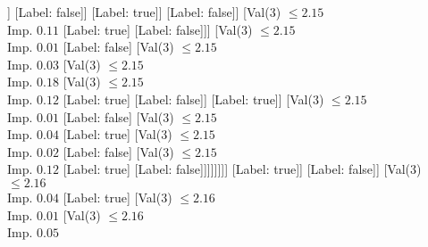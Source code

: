 \documentclass[margin=10pt]{standalone}
\begin{document}
\begin{forest}
																													[Val($3$) $ \leq 2.15$ \\ Imp. $0.02$
																														[Val($3$) $ \leq 2.15$ \\ Imp. $0.13$
																															[Val($3$) $ \leq 2.15$ \\ Imp. $0.03$
																																[Val($3$) $ \leq 2.14$ \\ Imp. $0.38$
																																	[Label: false]
																																	[Label: true]]
																																[Label: false]]
																															[Label: true]]
																														[Label: false]]
																													[Val($3$) $ \leq 2.15$ \\ Imp. $0.11$
																														[Label: true]
																														[Label: false]]]
																												[Val($3$) $ \leq 2.15$ \\ Imp. $0.01$
																													[Label: false]
																													[Val($3$) $ \leq 2.15$ \\ Imp. $0.03$
																														[Val($3$) $ \leq 2.15$ \\ Imp. $0.18$
																															[Val($3$) $ \leq 2.15$ \\ Imp. $0.12$
																																[Label: true]
																																[Label: false]]
																															[Label: true]]
																														[Val($3$) $ \leq 2.15$ \\ Imp. $0.01$
																															[Label: false]
																															[Val($3$) $ \leq 2.15$ \\ Imp. $0.04$
																																[Label: true]
																																[Val($3$) $ \leq 2.15$ \\ Imp. $0.02$
																																	[Label: false]
																																	[Val($3$) $ \leq 2.15$ \\ Imp. $0.12$
																																		[Label: true]
																																		[Label: false]]]]]]]]
																											[Label: true]]
																										[Label: false]]
																									[Val($3$) $ \leq 2.16$ \\ Imp. $0.04$
																										[Label: true]
																										[Val($3$) $ \leq 2.16$ \\ Imp. $0.01$
																											[Val($3$) $ \leq 2.16$ \\ Imp. $0.05$

\end{forest}
\end{document}
